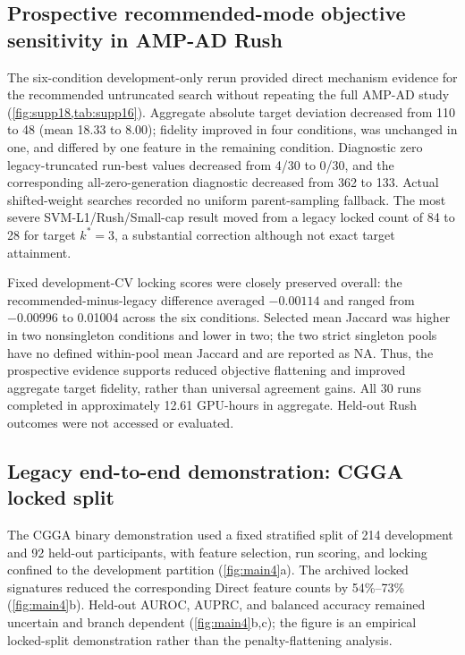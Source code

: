 \subsection{Prospective recommended-mode objective sensitivity in AMP-AD Rush}

The six-condition development-only rerun provided direct mechanism evidence for the recommended untruncated search without repeating the full AMP-AD study (\cref{fig:supp18,tab:supp16}). Aggregate absolute target deviation decreased from 110 to 48 (mean 18.33 to 8.00); fidelity improved in four conditions, was unchanged in one, and differed by one feature in the remaining condition. Diagnostic zero legacy-truncated run-best values decreased from 4/30 to 0/30, and the corresponding all-zero-generation diagnostic decreased from 362 to 133. Actual shifted-weight searches recorded no uniform parent-sampling fallback. The most severe SVM-L1/Rush/Small-cap result moved from a legacy locked count of 84 to 28 for target \(k^*=3\), a substantial correction although not exact target attainment.

Fixed development-CV locking scores were closely preserved overall: the recommended-minus-legacy difference averaged \(-0.00114\) and ranged from \(-0.00996\) to 0.01004 across the six conditions. Selected mean Jaccard was higher in two nonsingleton conditions and lower in two; the two strict singleton pools have no defined within-pool mean Jaccard and are reported as NA. Thus, the prospective evidence supports reduced objective flattening and improved aggregate target fidelity, rather than universal agreement gains. All 30 runs completed in approximately 12.61 GPU-hours in aggregate. Held-out Rush outcomes were not accessed or evaluated.



\subsection{Legacy end-to-end demonstration: CGGA locked split}

The CGGA binary demonstration used a fixed stratified split of 214 development and 92 held-out participants, with feature selection, run scoring, and locking confined to the development partition (\cref{fig:main4}a). The archived locked signatures reduced the corresponding Direct feature counts by 54\%--73\% (\cref{fig:main4}b). Held-out AUROC, AUPRC, and balanced accuracy remained uncertain and branch dependent (\cref{fig:main4}b,c); the figure is an empirical locked-split demonstration rather than the penalty-flattening analysis.

